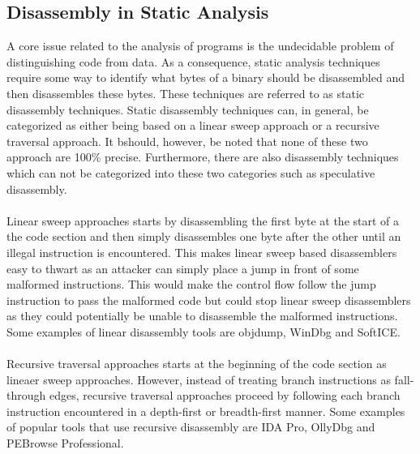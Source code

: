 \documentclass{kththesis}
\begin{document}
\subsection{Disassembly in Static Analysis}
A core issue related to the analysis of programs is the undecidable problem of distinguishing code from data\cite{ABinaryRewriting}. As a consequence, static analysis techniques require some way to identify what bytes of a binary should be disassembled and then disassembles these bytes. These techniques are referred to as static disassembly techniques. Static disassembly techniques can, in general, be categorized as either being based on a linear sweep approach or a recursive traversal approach\cite{DisassemblyOfExecutable}. It bshould, however, be noted that none of these two approach are 100\% precise\cite{ABinaryRewriting}. Furthermore, there are also disassembly techniques which can not be categorized into these two categories such as speculative disassembly\cite{preciseCFG}.
\\ \\
Linear sweep approaches starts by disassembling the first byte at the start of a the code section and then simply disassembles one byte after the other until an illegal instruction is encountered\cite{ABinaryRewriting}. This makes linear sweep based disassemblers easy to thwart as an attacker can simply place a jump in front of some malformed instructions. This would make the control flow follow the jump instruction to pass the malformed code but could stop linear sweep disassemblers as they could potentially be unable to disassemble the malformed instructions\cite{ABinaryRewriting}. Some examples of linear disassembly tools are objdump, WinDbg and SoftICE\cite{ReversingSecretsofReverseEngineering}.
\\ \\ 
Recursive traversal approaches starts at the beginning of the code section as lineaer sweep approaches. However, instead of treating branch instructions as fall-through edges, recursive traversal approaches proceed by following each branch instruction encountered in a depth-first or breadth-first manner. Some examples of popular tools that use recursive disassembly are IDA Pro, OllyDbg and PEBrowse Professional\cite{ReversingSecretsofReverseEngineering}.
\end{document}
